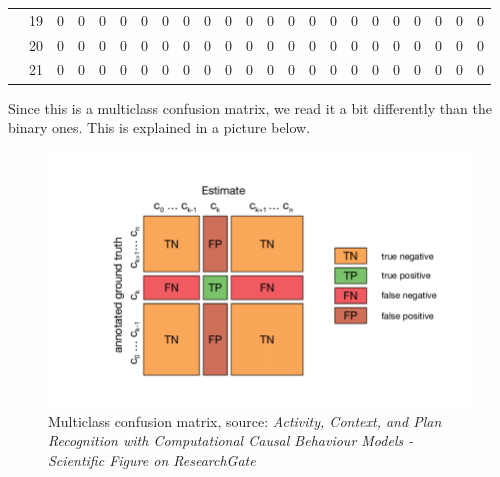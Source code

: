 \documentclass[12pt,a4paper]{article}
\begin{document}
\begin{center}
{\begin{tabular}{|c c c c c c c c c c c c c c c c c c c c c c c|}
            &\multicolumn{1}{c|}{19} & 0 & 0 & 0 & 0 & 0 & 0 & 0 & 0 & 0 & 0 & 0 & 0 & 0 & 0 & 0 & 0 & 0 & 0 & 0 & 0 & 0 \\
            &\multicolumn{1}{c|}{20} & 0 & 0 & 0 & 0 & 0 & 0 & 0 & 0 & 0 & 0 & 0 & 0 & 0 & 0 & 0 & 0 & 0 & 0 & 0 & 0 & 0 \\
            &\multicolumn{1}{c|}{21} & 0 & 0 & 0 & 0 & 0 & 0 & 0 & 0 & 0 & 0 & 0 & 0 & 0 & 0 & 0 & 0 & 0 & 0 & 0 & 0 & 0 \\ \hline
        \end{tabular}
        }
	\end{center}

    Since this is a multiclass confusion matrix, we read it a bit differently than the binary ones. This is explained in a picture below.

	\begin{figure}[H]
		\centering
		\includegraphics[width=1\linewidth]{images/Confusion_matrix_explanation.png}
		\caption{Multiclass confusion matrix, source: \small \textit{Activity, Context, and Plan Recognition with Computational Causal Behaviour Models - Scientific Figure on ResearchGate}}
    \end{figure}
    
     
\end{document}

